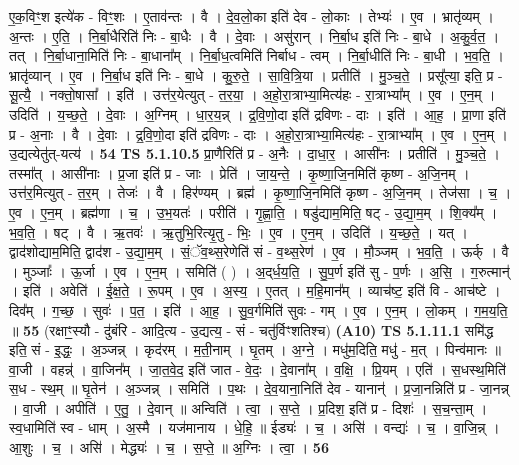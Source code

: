 \documentclass[17pt]{extarticle}
\begin{document}
                  ए॒क॒विꣳ॒॒श इत्ये॑क - विꣳ॒॒शः । ए॒ताव॑न्तः । वै । दे॒व॒लो॒का इति॑ देव - लो॒काः । तेभ्यः॑ । ए॒व । भ्रातृ॑व्यम् । अ॒न्तः । ए॒ति॒ । नि॒र्बा॒धैरिति॑ निः - बा॒धैः । वै । दे॒वाः । असु॑रान् । नि॒र्बा॒ध इति॑ निः - बा॒धे । अ॒कु॒र्व॒त॒ । तत् । नि॒र्बा॒धाना॒मिति॑ निः - बा॒धाना᳚म् । नि॒र्बा॒ध॒त्वमिति॑ निर्बाध - त्वम् । नि॒र्बा॒धीति॑ निः - बा॒धी । भ॒व॒ति॒ । भ्रातृ॑व्यान् । ए॒व । नि॒र्बा॒ध इति॑ निः - बा॒धे । कु॒रु॒ते॒ । सा॒वि॒त्रि॒या । प्रतीति॑ । मु॒ञ्च॒ते॒ । प्रसू᳚त्या॒ इति॒ प्र - सू॒त्यै॒ । नक्तो॒षासा᳚ । इति॑ । उत्त॑र॒येत्युत् - त॒र॒या॒ । अ॒हो॒रा॒त्राभ्या॒मित्य॑हः - रा॒त्राभ्या᳚म् । ए॒व । ए॒न॒म् । उदिति॑ । य॒च्छ॒ते॒ । दे॒वाः । अ॒ग्निम् । धा॒र॒य॒न्न् । द्र॒वि॒णो॒दा इति॑ द्रविणः - दाः । इति॑ । आ॒ह॒ । प्रा॒णा इति॑ प्र - अ॒नाः । वै । दे॒वाः । द्र॒वि॒णो॒दा इति॑ द्रविणः - दाः । अ॒हो॒रा॒त्राभ्या॒मित्य॑हः - रा॒त्राभ्या᳚म् । ए॒व । ए॒न॒म् । उ॒द्यत्येतु॑त्-यत्य॑ । \textbf{  54} \newline
                  \newline
                                \textbf{ TS 5.1.10.5} \newline
                  प्रा॒णैरिति॑ प्र - अ॒नैः । दा॒धा॒र॒ । आसी॑नः । प्रतीति॑ । मु॒ञ्च॒ते॒ । तस्मा᳚त् । आसी॑नाः । प्र॒जा इति॑ प्र - जाः । प्रेति॑ । जा॒य॒न्ते॒ । कृ॒ष्णा॒जि॒नमिति॑ कृष्ण - अ॒जि॒नम् । उत्त॑र॒मित्युत् - त॒र॒म् । तेजः॑ । वै । हिर॑ण्यम् । ब्रह्म॑ । कृ॒ष्णा॒जि॒नमिति॑ कृष्ण - अ॒जि॒नम् । तेज॑सा । च॒ । ए॒व । ए॒न॒म् । ब्रह्म॑णा । च॒ । उ॒भ॒यतः॑ । परीति॑ । गृ॒ह्णा॒ति॒ । षडु॑द्याम॒मिति॒ षट् - उ॒द्या॒म॒म् । शि॒क्य᳚म् । भ॒व॒ति॒ । षट् । वै । ऋ॒तवः॑ । ऋ॒तुभि॒रित्यृ॒तु - भिः॒ । ए॒व । ए॒न॒म् । उदिति॑ । य॒च्छ॒ते॒ । यत् । द्वाद॑शोद्याम॒मिति॒ द्वाद॑श - उ॒द्या॒म॒म् । सं॒ॅव॒थ्स॒रेणेति॑ सं - व॒थ्स॒रेण॑ । ए॒व । मौ॒ञ्जम् । भ॒व॒ति॒ । ऊर्क् । वै । मुञ्जाः᳚ । ऊ॒र्जा । ए॒व । ए॒न॒म् । समिति॑ ( ) । अ॒द्‌र्ध॒य॒ति॒ । सु॒प॒र्ण इति॑ सु - प॒र्णः । अ॒सि॒ । ग॒रुत्मान्॑ । इति॑ । अवेति॑ । ई॒क्ष॒ते॒ । रू॒पम् । ए॒व । अ॒स्य॒ । ए॒तत् । म॒हि॒मान᳚म् । व्याच॑ष्ट॒ इति॑ वि - आच॑ष्टे । दिव᳚म् । ग॒च्छ॒ । सुवः॑ । प॒त॒ । इति॑ । आ॒ह॒ । सु॒व॒र्गमिति॑ सुवः - गम् । ए॒व । ए॒न॒म् । लो॒कम् । ग॒म॒य॒ति॒ ॥ \textbf{  55 } \newline
                  \newline
                      (रक्षाꣳ॒॒स्यौ - दु॑बंरि - आदि॒त्य - उ॒द्यत्य॒ - सं - चतु॑र्विꣳशतिश्च)  \textbf{(A10)} \newline \newline
                                \textbf{ TS 5.1.11.1} \newline
                  समि॑द्ध इति॒ सं - इ॒द्धः॒ । अ॒ञ्जन्न् । कृद॑रम् । म॒ती॒नाम् । घृ॒तम् । अ॒ग्ने॒ । मधु॑म॒दिति॒ मधु॑ - म॒त् । पिन्व॑मानः ॥ वा॒जी । वहन्न्॑ । वा॒जिन᳚म् । जा॒त॒वे॒द॒ इति॑ जात - वे॒दः॒ । दे॒वाना᳚म् । व॒क्षि॒ । प्रि॒यम् । एति॑ । स॒धस्थ॒मिति॑ स॒ध - स्थ॒म् ॥ घृ॒तेन॑ । अ॒ञ्जन्न् । समिति॑ । प॒थः । दे॒व॒याना॒निति॑ देव - यानान्॑ । प्र॒जा॒नन्निति॑ प्र - जा॒नन्न् । वा॒जी । अपीति॑ । ए॒तु॒ । दे॒वान् ॥ अन्विति॑ । त्वा॒ । स॒प्ते॒ । प्र॒दिश॒ इति॑ प्र - दिशः॑ । स॒च॒न्ता॒म् । स्व॒धामिति॑ स्व - धाम् । अ॒स्मै । यज॑मानाय । धे॒हि॒ ॥ ईड्यः॑ । च॒ । असि॑ । वन्द्यः॑ । च॒ । वा॒जि॒न्न् । आ॒शुः । च॒ । असि॑ । मेद्ध्यः॑ । च॒ । स॒प्ते॒ ॥ अ॒ग्निः । त्वा॒ । \textbf{  56} \newline
\end{document}
